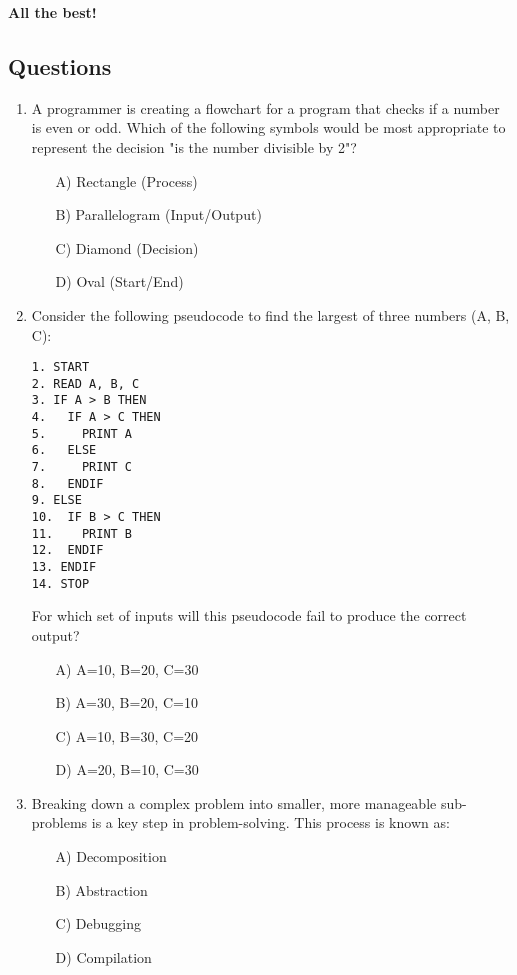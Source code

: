 \documentclass[9pt]{article}
\begin{document}
\begin{center}
\textbf{All the best!}
\end{center}

\newpage

\begin{multicols}{2}

\section*{Questions}

\begin{enumerate}
\item A programmer is creating a flowchart for a program that checks if a number is even or odd. Which of the following symbols would be most appropriate to represent the decision "is the number divisible by 2"?
\begin{enumerate}
\item[A)] Rectangle (Process)
\item[B)] Parallelogram (Input/Output)
\item[C)] Diamond (Decision)
\item[D)] Oval (Start/End)
\end{enumerate}

\item Consider the following pseudocode to find the largest of three numbers (A, B, C):
\begin{verbatim}
1. START
2. READ A, B, C
3. IF A > B THEN
4.   IF A > C THEN
5.     PRINT A
6.   ELSE
7.     PRINT C
8.   ENDIF
9. ELSE
10.  IF B > C THEN
11.    PRINT B
12.  ENDIF
13. ENDIF
14. STOP
\end{verbatim}
For which set of inputs will this pseudocode fail to produce the correct output?
\begin{enumerate}
    \item[A)] A=10, B=20, C=30
    \item[B)] A=30, B=20, C=10
    \item[C)] A=10, B=30, C=20
    \item[D)] A=20, B=10, C=30
\end{enumerate}

\item Breaking down a complex problem into smaller, more manageable sub-problems is a key step in problem-solving. This process is known as:
\begin{enumerate}
    \item[A)] Decomposition
    \item[B)] Abstraction
    \item[C)] Debugging
    \item[D)] Compilation
\end{enumerate}


\end{enumerate}
\end{multicols}
\end{document}
